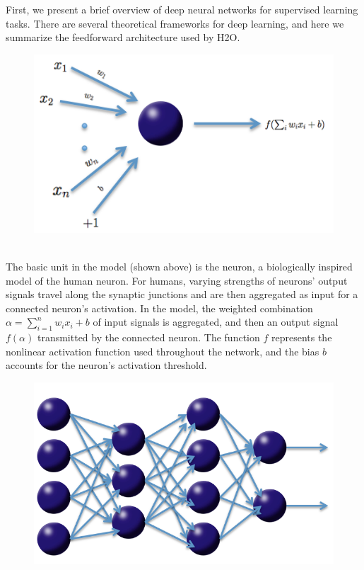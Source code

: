 First, we present a brief overview of deep neural networks for supervised learning tasks. There are several theoretical frameworks for deep learning, and here we summarize the feedforward architecture used by H2O. 
\\
\begin{figure}[h]
\centering
\includegraphics[scale=0.5]{neuron.png}
\end{figure}
\\
\noindent
The basic unit in the model (shown above) is the neuron, a biologically inspired model of the human neuron. For humans, varying strengths of neurons' output signals travel along the synaptic junctions and are then aggregated  as input for a connected neuron's activation. In the model, the weighted combination $\alpha = \sum_{i=1}^{n} w_i x_i + b$ of input signals is aggregated, and then an output signal $f(\alpha)$ transmitted by the connected neuron. The function $f$ represents the nonlinear activation function used throughout the network, and the bias $b$ accounts for the neuron's activation threshold.
\\
\begin{figure}[h!]
\centering
\includegraphics[scale=0.3]{net.png}
\end{figure}
